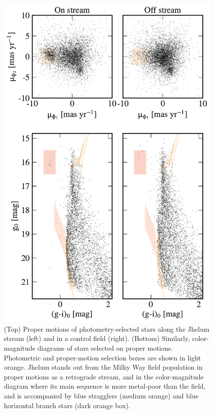 \documentclass[twocolumn]{aastex62}
\begin{document}
\begin{figure}
\begin{center}
\includegraphics[width=0.95\columnwidth]{selection.pdf}
\end{center}
\caption{
(Top) Proper motions of photometry-selected stars along the Jhelum stream (left) and in a control field (right). 
(Bottom) Similarly, color-magnitude diagrams of stars selected on proper motions.
Photometric and proper-motion selection boxes are shown in light orange.
Jhelum stands out from the Milky Way field population in proper motions as a retrograde stream, and in the color-magnitude diagram where its main sequence is more metal-poor than the field, and is accompanied by blue stragglers (medium orange) and blue horizontal branch stars (dark orange box).
}
\label{fig:properties}
\end{figure}
\end{document}
